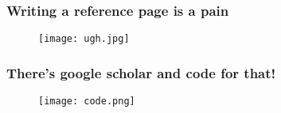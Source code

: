 \documentclass[12pt]{beamer}
\begin{document}
\begin{frame} %
\frametitle{Writing a reference page is a pain} %
\begin{figure}
           \begin{center}
                     \texttt{[image: ugh.jpg]}
           \end{center}
           \label{}
\end{figure}
\end{frame} %

\begin{frame} %
\frametitle{There's google scholar and code for that!} %
\begin{figure}
           \begin{center}
                     \texttt{[image: code.png]}
           \end{center}
           \label{}
\end{figure}
\end{frame} %
\end{document}

